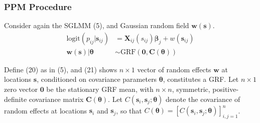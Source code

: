 \documentclass{article}
\begin{document}
\subsubsection{PPM Procedure}

Consider again the SGLMM (5), and Gaussian random field $\pmb{w}(\pmb{s})$.
\begin{align}
\text{logit}(p_{ij}|\pmb{s}_{ij}) &= \pmb{X}_{ij}(s_{ij}) \pmb{\beta}_{j} + w(\pmb{s}_{ij}) \\
\pmb{w}(\pmb{s}) | \pmb{\theta} &\sim \text{GRF}(\pmb{0}, \pmb{C}(\pmb{\theta}))
\end{align}

Define (20) as in (5), and (21) shows $n \times 1$ vector of random effects $\pmb{w}$ at locations $\pmb{s}$, conditioned on covariance parameters $\pmb{\theta}$, constitutes a GRF. Let $n \times 1$ zero vector $\pmb{0}$ be the stationary GRF mean, with $n \times n$, symmetric, positive-definite covariance matrix $\pmb{C}(\pmb{\theta})$. Let $C(\pmb{s}_{i}, \pmb{s}_{j}; \pmb{\theta})$ denote the covariance of random effects at locations $\pmb{s}_{i}$ and $\pmb{s}_{j}$, so that $C(\pmb{\theta}) = [C(\pmb{s}_{i}, \pmb{s}_{j}; \pmb{\theta})]_{i,j=1}^{n}$.
\end{document}
